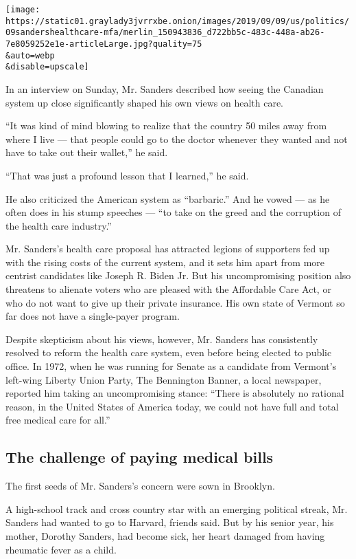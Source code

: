 \texttt{[image: https://static01.graylady3jvrrxbe.onion/images/2019/09/09/us/politics/09sandershealthcare-mfa/merlin\_150943836\_d722bb5c-483c-448a-ab26-7e8059252e1e-articleLarge.jpg?quality=75\\\&auto=webp\\\&disable=upscale]}

In an interview on Sunday, Mr. Sanders described how seeing the Canadian
system up close significantly shaped his own views on health care.

``It was kind of mind blowing to realize that the country 50 miles away
from where I live --- that people could go to the doctor whenever they
wanted and not have to take out their wallet,'' he said.

``That was just a profound lesson that I learned,'' he said.

He also criticized the American system as ``barbaric.'' And he vowed ---
as he often does in his stump speeches --- ``to take on the greed and
the corruption of the health care industry.''

Mr. Sanders's health care proposal has attracted legions of supporters
fed up with the rising costs of the current system, and it sets him
apart from more centrist candidates like Joseph R. Biden Jr. But his
uncompromising position also threatens to alienate voters who are
pleased with the Affordable Care Act, or who do not want to give up
their private insurance. His own state of Vermont so far does not have a
single-payer program.

Despite skepticism about his views, however, Mr. Sanders has
consistently resolved to reform the health care system, even before
being elected to public office. In 1972, when he was running for Senate
as a candidate from Vermont's left-wing Liberty Union Party, The
Bennington Banner, a local newspaper, reported him taking an
uncompromising stance: ``There is absolutely no rational reason, in the
United States of America today, we could not have full and total free
medical care for all.''

\hypertarget{the-challenge-of-paying-medical-bills}{%
\subsection{The challenge of paying medical
bills}\label{the-challenge-of-paying-medical-bills}}

The first seeds of Mr. Sanders's concern were sown in Brooklyn.

A high-school track and cross country star with an emerging political
streak, Mr. Sanders had wanted to go to Harvard, friends said. But by
his senior year, his mother, Dorothy Sanders, had become sick, her heart
damaged from having rheumatic fever as a child.

